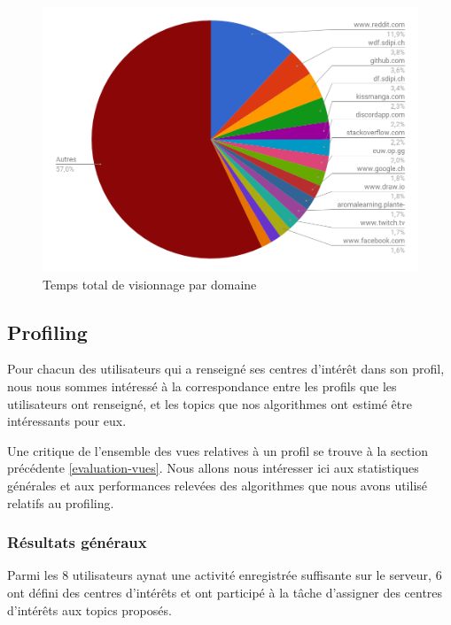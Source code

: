 	\begin{figure}[!h]
		\centering
		\includegraphics[height=0.75\textwidth]{images/results/temps_total_visionnage}
		\caption{Temps total de visionnage par domaine}
		\label{r-visionnage}
	\end{figure}


%
%
%
%
%
%

	\subsection{Profiling}

		Pour chacun des utilisateurs qui a renseigné ses centres d'intérêt dans son profil, nous nous sommes intéressé à la correspondance entre les profils que les utilisateurs ont renseigné, et les topics que nos algorithmes ont estimé être intéressants pour eux.

		Une critique de l'ensemble des vues relatives à un profil se trouve à la section précédente \ref{evaluation-vues}. Nous allons nous intéresser ici aux statistiques générales et aux performances relevées des algorithmes que nous avons utilisé relatifs au profiling.

		\subsubsection{Résultats généraux}

			Parmi les 8 utilisateurs aynat une activité enregistrée suffisante sur le serveur, 6 ont défini des centres d'intérêts et ont participé à la tâche d'assigner des centres d'intérêts aux topics proposés.

